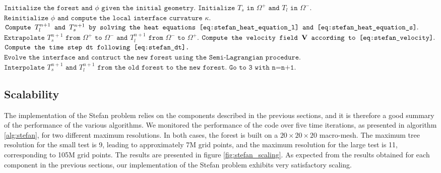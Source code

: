 \begin{algorithm}[htbp]
\caption{$\texttt{General procedure for solving the Stefan problem}$}
\begin{algorithmic}[1]
\State $\texttt{Initialize the forest and }\phi\texttt{ given the initial geometry}.$
\State $\texttt{Initialize }T_s\texttt{ in }\Omega^+\texttt{ and }T_l\texttt{ in }\Omega^-.$
\State $\texttt{Reinitialize }\phi\texttt{ and compute the local interface curvature }\kappa.$
\State $\texttt{Compute }T^{n+1}_l\texttt{ and }T^{n+1}_s\texttt{ by solving the heat equations \eqref{eq:stefan_heat_equation_l} and \eqref{eq:stefan_heat_equation_s}}.$
\State $\texttt{Extrapolate }T^{n+1}_s\texttt{ from }\Omega^+\texttt{ to }\Omega^-\texttt{ and }T^{n+1}_l\texttt{ from }\Omega^-\texttt{ to }\Omega^+.$
\State $\texttt{Compute the velocity field }\mathbf{V}\texttt{ according to \eqref{eq:stefan_velocity}}.$
\State $\texttt{Compute the time step dt following \eqref{eq:stefan_dt}.}$
\State $\texttt{Evolve the interface and contruct the new forest using the Semi-Lagrangian procedure}.$
\State $\texttt{Interpolate }T^{n+1}_s\texttt{ and }T^{n+1}_l\texttt{ from the old forest to the new forest}.$
\State $\texttt{Go to 3 with n=n+1}.$
\end{algorithmic}
\label{alg:stefan}
\end{algorithm}

\subsection{Scalability}

The implementation of the Stefan problem relies on the components described in the previous sections, and it is therefore a good summary of the performance of the various algorithms. We monitored the performance of the code over five time iterations, as presented in algorithm \ref{alg:stefan}, for two different maximum resolutions. In both cases, the forest is built on a $20\times20\times20$ macro-mesh. The maximum tree resolution for the small test is 9, leading to approximately 7M grid points, and the maximum resolution for the large test is 11, corresponding to 105M grid points. The results are presented in figure \ref{fig:stefan_scaling}. As expected from the results obtained for each component in the previous sections, our implementation of the Stefan problem exhibits very satisfactory scaling.

